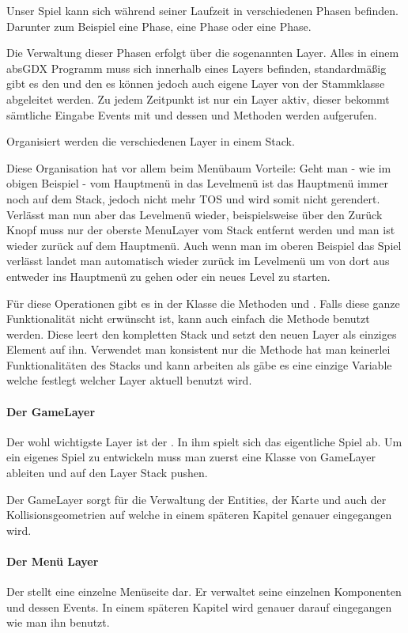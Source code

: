 Unser Spiel kann sich während seiner Laufzeit in verschiedenen Phasen befinden. Darunter zum Beispiel eine  Phase, eine  Phase oder eine  Phase.

Die Verwaltung dieser Phasen erfolgt über die sogenannten Layer. Alles in einem absGDX Programm muss sich innerhalb eines Layers befinden, standardmäßig gibt es den  und den  es können jedoch auch eigene Layer von der Stammklasse  abgeleitet werden. Zu jedem Zeitpunkt ist nur ein Layer aktiv, dieser bekommt sämtliche Eingabe Events mit und dessen  und  Methoden werden aufgerufen.

Organisiert werden die verschiedenen Layer in einem Stack.


Diese Organisation hat vor allem beim Menübaum Vorteile: Geht man - wie im obigen Beispiel - vom Hauptmenü in das Levelmenü ist das Hauptmenü immer noch auf dem Stack, jedoch nicht mehr TOS  und wird somit nicht gerendert. Verlässt man nun aber das Levelmenü wieder, beispielsweise über den Zurück Knopf muss nur der oberste MenuLayer vom Stack entfernt werden und man ist wieder zurück auf dem Hauptmenü. Auch wenn man im oberen Beispiel das Spiel verlässt landet man automatisch wieder zurück im Levelmenü um von dort aus entweder ins Hauptmenü zu gehen oder ein neues Level zu starten.

Für diese Operationen gibt es in der Klasse  die Methoden  und . Falls diese ganze Funktionalität nicht erwünscht ist, kann auch einfach die Methode  benutzt werden. Diese leert den kompletten Stack und setzt den neuen Layer als einziges Element auf ihn. Verwendet man konsistent nur die Methode  hat man keinerlei Funktionalitäten des Stacks und kann arbeiten als gäbe es eine einzige Variable welche festlegt welcher Layer aktuell benutzt wird.

\paragraph{Der GameLayer}

Der wohl wichtigste Layer ist der . In ihm spielt sich das eigentliche Spiel ab. Um ein eigenes Spiel zu entwickeln muss man zuerst eine Klasse von GameLayer ableiten und auf den Layer Stack pushen.

Der GameLayer sorgt für die Verwaltung der Entities, der Karte und auch der Kollisionsgeometrien auf welche in einem späteren Kapitel genauer eingegangen wird.

\paragraph{Der Menü Layer}

Der  stellt eine einzelne Menüseite dar. Er verwaltet seine einzelnen Komponenten und dessen Events. In einem späteren Kapitel wird genauer darauf eingegangen wie man ihn benutzt.